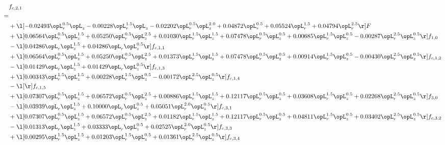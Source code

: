 \begin{alignat}{2} 
\label{eq:f_21_1} 
& f_{c,2,1} \nonumber \\ 
 = \\ 
& + \l[  -0.02493 \opL_r^{0.5} \opL_z   -0.00228 \opL_r^{1.5} \opL_z   -0.02202 \opL_r^{0.5} \opL_z^{2.0} +  0.04872 \opL_r^{0.5} +  0.05524 \opL_r^{1.5} +  0.04794 \opL_r^{2.5}  \r] F \nonumber \\ 
& + \l[  0.06564 \opL_r^{0.5} \opL_z^{1.5} +  0.05250 \opL_r^{0.5} \opL_z^{2.5} +  0.01030 \opL_r^{1.5} \opL_z^{1.5} +  0.07478 \opL_r^{0.5} \opL_z^{0.5} +  0.00685 \opL_r^{1.5} \opL_z^{0.5}   -0.00287 \opL_r^{2.5} \opL_z^{0.5}  \r] f_{1,0} \nonumber \\ 
& - \l[  0.04286 \opL_r \opL_z^{1.5} +  0.04286 \opL_r \opL_z^{0.5}  \r] f_{c,1,1} \nonumber \\ 
& + \l[  0.06564 \opL_r^{0.5} \opL_z^{1.5} +  0.05250 \opL_r^{0.5} \opL_z^{2.5} +  0.01373 \opL_r^{1.5} \opL_z^{1.5} +  0.07478 \opL_r^{0.5} \opL_z^{0.5} +  0.00914 \opL_r^{1.5} \opL_z^{0.5}   -0.00430 \opL_r^{2.5} \opL_z^{0.5}  \r] f_{c,1,2} \nonumber \\ 
& - \l[  0.01429 \opL_r \opL_z^{1.5} +  0.01429 \opL_r \opL_z^{0.5}  \r] f_{c,1,3} \nonumber \\ 
& + \l[  0.00343 \opL_r^{1.5} \opL_z^{1.5} +  0.00228 \opL_r^{1.5} \opL_z^{0.5}   -0.00172 \opL_r^{2.5} \opL_z^{0.5}  \r] f_{c,1,4} \nonumber \\ 
& - \l[  \r] f_{c,1,5} \nonumber \\ 
& + \l[  0.07307 \opL_r^{0.5} \opL_z^{1.5} +  0.06572 \opL_r^{0.5} \opL_z^{2.5} +  0.00886 \opL_r^{1.5} \opL_z^{1.5} +  0.12117 \opL_r^{0.5} \opL_z^{0.5} +  0.03608 \opL_r^{1.5} \opL_z^{0.5} +  0.02268 \opL_r^{2.5} \opL_z^{0.5}  \r] f_{3,0} \nonumber \\ 
& - \l[  0.03939 \opL_r \opL_z^{1.5} +  0.10000 \opL_r \opL_z^{0.5} +  0.05051 \opL_r^{2.0} \opL_z^{0.5}  \r] f_{c,3,1} \nonumber \\ 
& + \l[  0.07307 \opL_r^{0.5} \opL_z^{1.5} +  0.06572 \opL_r^{0.5} \opL_z^{2.5} +  0.01182 \opL_r^{1.5} \opL_z^{1.5} +  0.12117 \opL_r^{0.5} \opL_z^{0.5} +  0.04811 \opL_r^{1.5} \opL_z^{0.5} +  0.03402 \opL_r^{2.5} \opL_z^{0.5}  \r] f_{c,3,2} \nonumber \\ 
& - \l[  0.01313 \opL_r \opL_z^{1.5} +  0.03333 \opL_r \opL_z^{0.5} +  0.02525 \opL_r^{2.0} \opL_z^{0.5}  \r] f_{c,3,3} \nonumber \\ 
& + \l[  0.00295 \opL_r^{1.5} \opL_z^{1.5} +  0.01203 \opL_r^{1.5} \opL_z^{0.5} +  0.01361 \opL_r^{2.5} \opL_z^{0.5}  \r] f_{c,3,4} \nonumber \\ 

\end{alignat}
